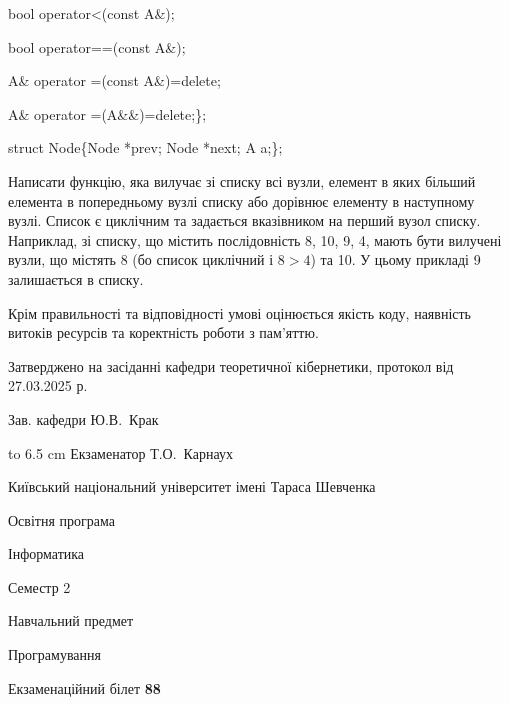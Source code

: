 \documentclass[12pt, ukrainian]{article}
\begin{document}
{\quad  bool operator<(const A\&); 

\quad  bool operator==(const A\&); 

\quad A\& operator =(const A\&)=delete; 

\quad  A\& operator =(A\&\&)=delete;\};

struct Node\{Node *prev; Node *next; A a;\};

Написати функцію, яка вилучає зі списку всі вузли, елемент в яких більший елемента в попередньому вузлі списку або дорівнює елементу в наступному вузлі. Список є циклічним та задається вказівником на перший вузол списку. Наприклад, зі списку, що містить послідовність 8, 10, 9, 4, мають бути вилучені вузли, що містять 8 (бо список циклічний і $8>4$) та 10. У цьому прикладі 9 залишається в списку.

Крім правильності та відповідності умові оцінюється якість коду, наявність витоків ресурсів та коректність роботи з пам'яттю. 

}
{\smallskip\smallskip \begin {scriptsize} Затверджено на засіданні кафедри теоретичної кібернетики, протокол   від   27.03.2025 р.\par\smallskip\smallskip\smallskip\smallskip
{\parbox {6.5 cm} {Зав. кафедри \dotfill Ю.В.~Крак}}\hspace {0.7cm} {\hbox to 6.5 cm { Екзаменатор \dotfill Т.О.~Карнаух}} \end{scriptsize}}
\newpage
{{\begin {scriptsize}\par
{ \center  Київський національний університет імені Тараса Шевченка \par}
{\parbox {5 cm}{Освітня програма \hfill}{\parbox {7 cm}{Інформатика\hfill}}\parbox {6 cm}{\hfill Семестр 2}}\par
{\parbox {5 cm} {Навчальний предмет \hfill}\parbox {7 cm}{Програмування \hfill}\parbox {6cm}{\hfill}\par}\vspace{-15pt} \end{scriptsize}}{\center Екзаменаційний білет \No \textbf { 88 }\par}}
\end{document}
